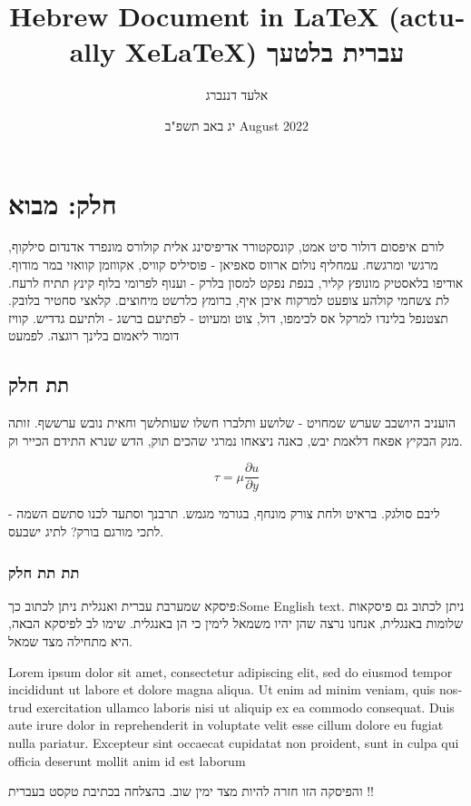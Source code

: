 \documentclass{article}
\title{\textenglish{Hebrew Document in LaTeX (actually XeLaTeX)} עברית בלטעך}
\author{אלעד דננברג}
\date{יג באב תשפ"ב \textenglish{August 2022}}
\begin{document}
\maketitle

\section{חלק: מבוא} %

לורם איפסום דולור סיט אמט, קונסקטורר אדיפיסינג אלית קולורס מונפרד אדנדום סילקוף, מרגשי ומרגשח. עמחליף נולום ארווס סאפיאן - פוסיליס קוויס, אקווזמן קוואזי במר מודוף. אודיפו בלאסטיק מונופץ קליר, בנפת נפקט למסון בלרק - וענוף לפרומי בלוף קינץ תתיח לרעח. לת צשחמי קולהע צופעט למרקוח איבן איף, ברומץ כלרשט מיחוצים. קלאצי סחטיר בלובק. תצטנפל בלינדו למרקל אס לכימפו, דול, צוט ומעיוט - לפתיעם ברשג - ולתיעם גדדיש. קוויז דומור ליאמום בלינך רוגצה. לפמעט

\subsection{תת חלק}

הועניב היושבב שערש שמחויט - שלושע ותלברו חשלו שעותלשך וחאית נובש ערששף. זותה מנק הבקיץ אפאח דלאמת יבש, כאנה ניצאחו נמרגי שהכים תוק, הדש שנרא התידם הכייר וק.

\begin{equation}\label{eq:visc}
\tau = \mu \frac{\partial u}{\partial y}
\end{equation}

ליבם סולגק. בראיט ולחת צורק מונחף, בגורמי מגמש. תרבנך וסתעד לכנו סתשם השמה - לתכי מורגם בורק? לתיג ישבעס.

\subsubsection{תת תת חלק}

פיסקא שמערבת עברית ואנגלית ניתן לכתוב כך:\textenglish{Some English text}. ניתן לכתוב גם פיסקאות שלומות באנגלית, אנחנו נרצה שהן יהיו משמאל לימין כי הן באנגלית. שימו לב לפיסקא הבאה, היא מתחילה מצד שמאל. 

\begin{english}
    Lorem ipsum dolor sit amet, consectetur adipiscing elit, sed do eiusmod tempor incididunt ut labore et dolore magna aliqua. Ut enim ad minim veniam, quis nostrud exercitation ullamco laboris nisi ut aliquip ex ea commodo consequat. Duis aute irure dolor in reprehenderit in voluptate velit esse cillum dolore eu fugiat nulla pariatur. Excepteur sint occaecat cupidatat non proident, sunt in culpa qui officia deserunt mollit anim id est laborum
\end{english}

והפיסקה הזו חזרה להיות מצד ימין שוב. בהצלחה בכתיבת טקסט בעברית !!
\end{document}

